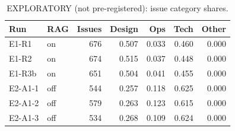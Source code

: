 \begin{table}[t]
\centering
\small
\caption{EXPLORATORY (not pre-registered): issue category shares.}
\label{tab:e7-exp-cat}
\begin{tabular}{llrrrrr}
\toprule
Run & RAG & Issues & Design & Ops & Tech & Other \\
\midrule
E1-R1 & on & 676 & 0.507 & 0.033 & 0.460 & 0.000 \\
E1-R2 & on & 674 & 0.515 & 0.037 & 0.448 & 0.000 \\
E1-R3b & on & 651 & 0.504 & 0.041 & 0.455 & 0.000 \\
E2-A1-1 & off & 544 & 0.257 & 0.118 & 0.625 & 0.000 \\
E2-A1-2 & off & 579 & 0.263 & 0.123 & 0.615 & 0.000 \\
E2-A1-3 & off & 534 & 0.268 & 0.109 & 0.624 & 0.000 \\
\bottomrule
\end{tabular}
\end{table}
